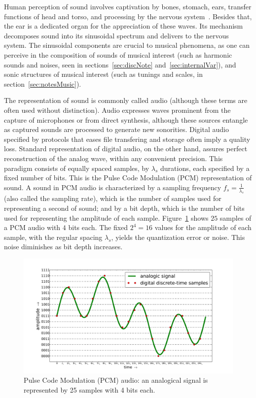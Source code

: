 \documentclass[
 aip,
 jmp,
 amsmath,amssymb,
 reprint,
]{revtex4-1}
\begin{document}
Human perception of sound involves captivation by bones, stomach, ears, transfer functions of head and torso, and processing by the nervous system~\cite{}. Besides that, the ear is a dedicated organ for the appreciation of these waves. Its mechanism decomposes sound into its sinusoidal spectrum and delivers to the nervous system. The sinusoidal components are crucial to musical phenomena, as one can perceive in the composition of sounds of musical interest (such as harmonic sounds and noises, seen in sections~\ref{sec:discNote} and~\ref{sec:internalVar}), and sonic structures of musical interest (such as tunings and scales, in section~\ref{sec:notesMusic}). 

The representation of sound is commonly called audio (although these terms are often used without distinction). Audio expresses waves prominent from the capture of microphones or from direct synthesis, although these sources entangle as captured sounds are processed to generate new sonorities. Digital audio specified by protocols that eases file transfering and storage often imply a quality loss. Standard representation of digital audio, on the other hand, assures perfect reconstruction of the analog wave, within any convenient precision. This paradigm consists of equally spaced samples, by $\lambda_s$ durations, each specified by a fixed number of bits. This is the Pulse Code Modulation (PCM) representation of sound. A sound in PCM audio is characterized by a sampling frequency $f_s=\frac{1}{\lambda_s}$ (also called the sampling rate), which is the number of samples used for representing a second of sound; and by a bit depth, which is the number of bits used for representing the amplitude of each sample. Figure~\ref{fig:PCM} shows $25$ samples of a PCM audio with $4$ bits each. The fixed $2^4=16$ values for the amplitude of each sample, with the regular spacing $\lambda_s$, yields the quantization error or noise. This noise diminishes as bit depth increases.

\begin{figure}
    \centering
        \includegraphics[width=\textwidth]{figures/pcm}
        \caption{Pulse Code Modulation (PCM) audio: an analogical signal is represented by 25 samples with 4 bits each.}
        \label{fig:PCM}
\end{figure}
\end{document}
